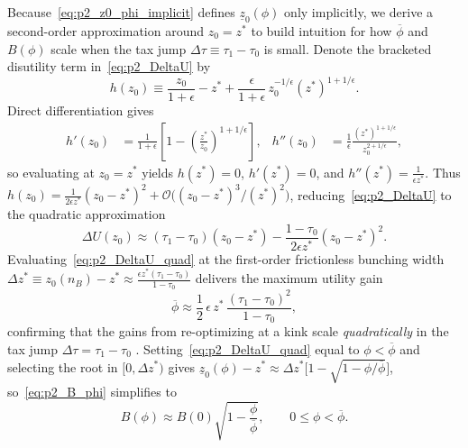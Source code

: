 Because~\eqref{eq:p2_z0_phi_implicit} defines $\underline{z}_0(\phi)$ only implicitly, we derive a second-order approximation around $z_0 = z^*$ to build intuition for how $\overline{\phi}$ and $B(\phi)$ scale when the tax jump $\Delta\tau \equiv \tau_1 - \tau_0$ is small. Denote the bracketed disutility term in~\eqref{eq:p2_DeltaU} by
\begin{equation}
h(z_0) \equiv \frac{z_0}{1+\epsilon} - z^* + \frac{\epsilon}{1+\epsilon}\,z_0^{-1/\epsilon}(z^*)^{1+1/\epsilon}.
\end{equation}
Direct differentiation gives
\begin{align}
h'(z_0) &= \frac{1}{1+\epsilon}\left[1 - \left(\frac{z^*}{z_0}\right)^{1+1/\epsilon}\right], &
h''(z_0) &= \frac{1}{\epsilon}\frac{(z^*)^{1+1/\epsilon}}{z_0^{2+1/\epsilon}},
\end{align}
so evaluating at $z_0 = z^*$ yields $h(z^*) = 0$, $h'(z^*) = 0$, and $h''(z^*) = \frac{1}{\epsilon z^*}$. Thus $h(z_0) = \frac{1}{2\epsilon z^*}(z_0 - z^*)^2 + \mathcal{O}\!\big((z_0 - z^*)^3/(z^*)^2\big)$, reducing~\eqref{eq:p2_DeltaU} to the quadratic approximation
\begin{equation}
\Delta U(z_0) \approx (\tau_1 - \tau_0)(z_0 - z^*) - \frac{1-\tau_0}{2\epsilon z^*}(z_0 - z^*)^2.
\label{eq:p2_DeltaU_quad}
\end{equation}
Evaluating~\eqref{eq:p2_DeltaU_quad} at the first-order frictionless bunching width $\Delta z^* \equiv z_0(n_B) - z^* \approx \frac{\epsilon z^*(\tau_1 - \tau_0)}{1 - \tau_0}$ delivers the maximum utility gain
\begin{equation}
\overline{\phi} \approx \frac{1}{2}\,\epsilon\,z^*\,\frac{(\tau_1 - \tau_0)^2}{1 - \tau_0},
\label{eq:p2_phibar_approx}
\end{equation}
confirming that the gains from re-optimizing at a kink scale \emph{quadratically} in the tax jump $\Delta\tau = \tau_1 - \tau_0$ \parencite{chetty2011adjustment}. Setting~\eqref{eq:p2_DeltaU_quad} equal to $\phi < \overline{\phi}$ and selecting the root in $[0, \Delta z^*)$ gives $\underline{z}_0(\phi) - z^* \approx \Delta z^*\big[1 - \sqrt{1 - \phi/\overline{\phi}}\big]$, so~\eqref{eq:p2_B_phi} simplifies to
\begin{equation}
B(\phi) \approx B(0)\sqrt{1 - \frac{\phi}{\overline{\phi}}}, \qquad 0 \le \phi < \overline{\phi}.
\label{eq:p2_B_phi_approx}
\end{equation}


